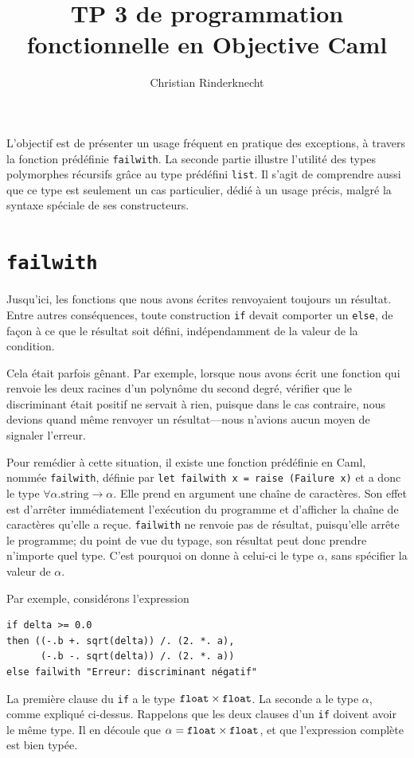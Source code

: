 \documentclass[11pt,a4paper]{article}
\title{TP 3 de programmation fonctionnelle en Objective Caml}
\author{Christian Rinderknecht}
\begin{document}
\maketitle

L'objectif est de présenter un usage fréquent en pratique des
exceptions, à travers la fonction prédéfinie \texttt{failwith}. La
seconde partie illustre l'utilité des types polymorphes récursifs
grâce au type prédéfini \texttt{list}. Il s'agit de comprendre aussi
que ce type est seulement un cas particulier, dédié à un usage précis,
malgré la syntaxe spéciale de ses constructeurs.

\section{{\tt failwith}}

Jusqu'ici, les fonctions que nous avons écrites renvoyaient toujours
un résultat. Entre autres conséquences, toute construction {\tt if}
devait comporter un {\tt else}, de façon à ce que le résultat soit
défini, indépendamment de la valeur de la condition.

Cela était parfois gênant. Par exemple, lorsque nous avons écrit une
fonction qui renvoie les deux racines d'un polynôme du second degré,
vérifier que le discriminant était positif ne servait à rien, puisque
dans le cas contraire, nous devions quand même renvoyer un
résultat---nous n'avions aucun moyen de signaler l'erreur.

Pour remédier à cette situation, il existe une fonction prédéfinie en
Caml, nommée {\tt failwith}, définie par \texttt{let failwith x =
raise (Failure x)} et a donc le type
$\forall\alpha.\text{string}\rightarrow\alpha$. Elle prend en argument
une chaîne de caractères. Son effet est d'arrêter immédiatement
l'exécution du programme et d'afficher la chaîne de caractères qu'elle
a reçue. {\tt failwith} ne renvoie pas de résultat, puisqu'elle arrête
le programme; du point de vue du typage, son résultat peut donc
prendre n'importe quel type. C'est pourquoi on donne à celui-ci le
type $\alpha$, sans spécifier la valeur de $\alpha$.

Par exemple, considérons l'expression

\begin{verbatim}
if delta >= 0.0
then ((-.b +. sqrt(delta)) /. (2. *. a),
      (-.b -. sqrt(delta)) /. (2. *. a))
else failwith "Erreur: discriminant négatif"
\end{verbatim}

La première clause du {\tt if} a le type $\text{\tt
float}\times\text{\tt float}$. La seconde a le type $\alpha$, comme
expliqué ci-dessus. Rappelons que les deux clauses d'un {\tt if}
doivent avoir le même type. Il en découle que $\alpha=\text{\tt
float}\times\text{\tt float}$, et que l'expression complète est bien
typée.
\end{document}
